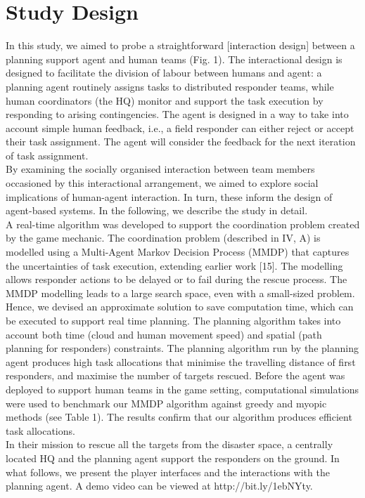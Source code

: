 \section{Study Design}
In this study, we aimed to probe a straightforward [interaction design] between a planning support agent and human teams (Fig. 1). The interactional design is designed to facilitate the division of labour between humans and agent: a planning agent routinely assigns tasks to distributed responder teams, while human coordinators (the HQ) monitor and support the task execution by responding to arising contingencies. The agent is designed in a way to take into account simple human feedback, i.e., a field responder can either reject or accept their task assignment. The agent will consider the feedback for the next iteration of task assignment. \\

By examining the socially organised interaction between team members occasioned by this interactional arrangement, we aimed to explore social implications of human-agent interaction. In turn, these inform the design of agent-based systems. In the following, we describe the study in detail. \\

A real-time algorithm was developed to support the coordination problem created by the game mechanic. The coordination problem (described in IV, A) is modelled using a Multi-Agent Markov Decision Process (MMDP) that captures the uncertainties of task execution, extending earlier work [15]. The modelling allows responder actions to be delayed or to fail during the rescue process. The MMDP modelling leads to a large search space, even with a small-sized problem. Hence, we devised an approximate solution to save computation time, which can be executed to support real time planning. The planning algorithm takes into account both time (cloud and human movement speed) and spatial (path planning for responders) constraints. The planning algorithm run by the planning agent produces high task allocations that minimise the travelling distance of first responders, and maximise the number of targets rescued. Before the agent was deployed to support human teams in the game setting, computational simulations were used to benchmark our MMDP algorithm against greedy and myopic methods (see Table 1). The results confirm that our algorithm produces efficient task allocations. \\

In their mission to rescue all the targets from the disaster space, a centrally located HQ and the planning agent support the responders on the ground. In what follows, we present the player interfaces and the interactions with the planning agent. A demo video can be viewed at http://bit.ly/1ebNYty.\\

